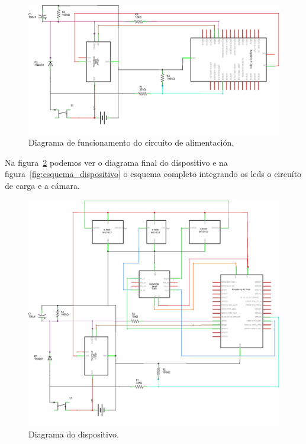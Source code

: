 \begin{itemize}
    \begin{figure}[tb]
      \centering
    	\includegraphics[scale=1]{imaxes/circuito-bateria.png}
    	\caption{Diagrama de funcionamento do circuíto de alimentación.}
    	\label{fig:circuito_alimentacion}
    \end{figure}

    Na figura~\ref{fig:circuito_dispositivo} podemos ver o diagrama final do dispositivo e na figura~\ref{fig:esquema_dispositivo} o esquema completo integrando os leds o circuíto de carga e a cámara.

    \begin{figure}[tb]
      \centering
    	\includegraphics[scale=1]{imaxes/circuito-completo.png}
    	\caption{Diagrama do dispositivo.}
    	\label{fig:circuito_dispositivo}
    \end{figure}


\end{itemize}
